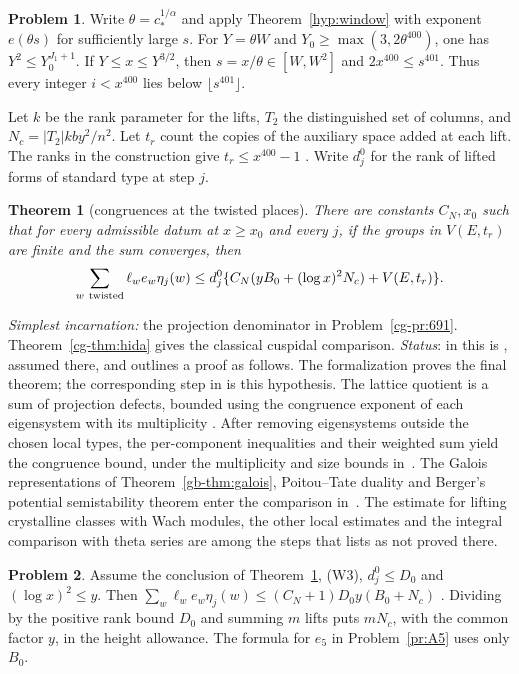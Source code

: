 \documentclass[reqno]{amsart}
\theoremstyle{definition}
\newtheorem{problem}{Problem}[section]
\theoremstyle{plain}
\newtheorem{theorem}{Theorem}[section]
\begin{document}
\begin{problem}\label{pr:rescale}
Write \(\theta=c_*^{1/\alpha}\) and apply Theorem~\ref{hyp:window} with exponent \(e(\theta s)\) for sufficiently large \(s\).  For \(Y=\theta W\) and \(Y_0\ge\max(3,2\theta^{400})\), one has \(Y^2\le Y_0^{J_1+1}\).  If \(Y\le x\le Y^{3/2}\), then \(s=x/\theta\in[W,W^2]\) and \(2x^{400}\le s^{401}\).  Thus every integer \(i<x^{400}\) lies below \(\lfloor s^{401}\rfloor\).
\end{problem}

Let \(k\) be the rank parameter for the lifts, \(T_2\) the distinguished set of columns, and \(N_c=|T_2|kby^2/n^2\).  Let \(t_r\) count the copies of the auxiliary space added at each lift.  The ranks in the construction give \(t_r\le x^{400}-1\) \cite[Lemma~18.2]{Adr}.  Write \(d_j^0\) for the rank of lifted forms of standard type at step \(j\).

\begin{theorem}[congruences at the twisted places]\label{hyp:congruence}
There are constants \(C_N,x_0\) such that for every admissible datum at \(x\ge x_0\) and every \(j\), if the groups in \(V(E,t_r)\) are finite and the sum converges, then
\[
 \sum_{w\ {\rm twisted}}\ell_we_w\eta_j(w)
 \le d_j^0\{C_N(yB_0+(\log x)^2N_c)+V(E,t_r)\}.
\]
\end{theorem}
\noindent\emph{Simplest incarnation:} the projection denominator in Problem~\ref{cg-pr:691}.  Theorem~\ref{cg-thm:hida} gives the classical cuspidal comparison. \emph{Status}: in \cite{Adr} this is \cite[Hyp.~17.24]{Adr}, assumed there, and \cite{Adr} outlines a proof as follows.  The formalization proves the final theorem; the corresponding step in \cite{Adr} is this hypothesis.
The lattice quotient is a sum of projection defects, bounded using the congruence exponent of each eigensystem with its multiplicity \cite[Props.~17.25, 17.30]{Adr}.  After removing eigensystems outside the chosen local types, the per-component inequalities and their weighted sum yield the congruence bound, under the multiplicity and size bounds in~\cite[Prop.~17.34, Hyp.~17.36]{Adr}.  The Galois representations of Theorem~\ref{gb-thm:galois}, Poitou--Tate duality and Berger's potential semistability theorem enter the comparison in~\cite[\S17.5]{Adr}.  The estimate for lifting crystalline classes with Wach modules, the other local estimates and the integral comparison with theta series are among the steps that \cite[\S18.7]{Adr} lists as not proved there.

\begin{problem}\label{pr:budget}
Assume the conclusion of Theorem~\ref{hyp:congruence}, (W3), \(d_j^0\le D_0\) and \((\log x)^2\le y\).  Then \(\sum_w\ell_we_w\eta_j(w)\le (C_N+1)D_0y(B_0+N_c)\) \cite[Thm.~17.37]{Adr}.  Dividing by the positive rank bound \(D_0\) and summing \(m\) lifts puts \(mN_c\), with the common factor \(y\), in the height allowance.  The formula for \(e_5\) in Problem~\ref{pr:A5} uses only \(B_0\).
\end{problem}
\end{document}
